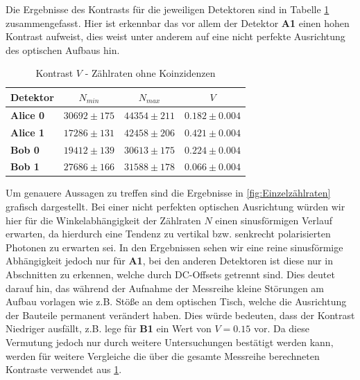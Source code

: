 \documentclass[12pt,a4paper]{article}
\begin{document}
	Die Ergebnisse des Kontrasts für die jeweiligen Detektoren sind in Tabelle \ref{tab:ZählratenOhneKoinz} zusammengefasst.
	Hier ist erkennbar das vor allem der Detektor \textbf{A1} einen hohen Kontrast aufweist, dies weist unter anderem
	auf eine nicht perfekte Ausrichtung des optischen Aufbaus hin.
	\begin{table}[H]
		\caption{Kontrast \(V\) - Zählraten ohne Koinzidenzen}\label{tab:ZählratenOhneKoinz}
		\begin{center}
			\begin{tabular}[c]{l|l|l|l}
				\hline
				\multicolumn{1}{c|}{\textbf{Detektor}} &
				\multicolumn{1}{c|}{\textbf{\(N_{min}\)}} &
				\multicolumn{1}{c|}{\textbf{\(N_{max}\)}} &
				\multicolumn{1}{c}{\textbf{\(V\)}} \\
				\hline
				\textbf{Alice 0} & \(30692 \pm 175\) & \(44354 \pm 211\) & \(0.182 \pm 0.004\) \\
				\textbf{Alice 1} & \(17286 \pm 131\) & \(42458 \pm 206\) & \(0.421 \pm 0.004\) \\
				\textbf{Bob 0}   & \(19412 \pm 139\) & \(30613 \pm 175\) & \(0.224 \pm 0.004\) \\
				\textbf{Bob 1}   & \(27686 \pm 166\) & \(31588 \pm 178\) & \(0.066 \pm 0.004\)\\

				\hline
			\end{tabular}
		\end{center}
	\end{table}
	Um genauere Aussagen zu treffen sind die Ergebnisse in \ref{fig:Einzelzählraten} grafisch dargestellt.
	Bei einer nicht perfekten optischen Ausrichtung würden wir hier für die Winkelabhängigkeit der Zählraten \(N\)
	einen sinusförmigen Verlauf erwarten, da hierdurch eine Tendenz zu vertikal bzw. senkrecht polarisierten Photonen
	zu erwarten sei.
	\newline
	In den Ergebnissen sehen wir eine reine sinusförmige Abhängigkeit jedoch nur für \textbf{A1}, bei den anderen
	Detektoren ist diese nur in Abschnitten zu erkennen, welche durch
	DC-Offsets getrennt sind.
	Dies deutet darauf hin, das während der Aufnahme der Messreihe kleine Störungen am Aufbau vorlagen wie z.B.
	Stöße an dem optischen Tisch, welche die Ausrichtung der Bauteile permanent verändert haben.
	Dies würde bedeuten, dass der Kontrast Niedriger ausfällt, z.B. lege für \textbf{B1} ein Wert von
	\(V=0.15\) vor.
	\newline
	Da diese Vermutung jedoch nur durch weitere Untersuchungen bestätigt werden kann, werden für weitere Vergleiche
	die über die gesamte Messreihe berechneten Kontraste verwendet aus \ref{tab:ZählratenOhneKoinz}.
\end{document}
